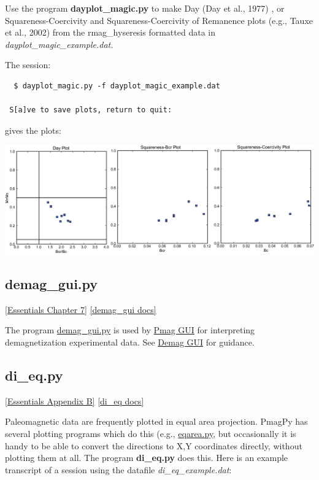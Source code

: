 \documentclass[11pt]{book}
\begin{document}
{{ Use the program {\bf dayplot\_magic.py}  to make Day (Day et al., 1977) \nocite{day77}, or Squareness-Coercivity and Squareness-Coercivity of Remanence plots (e.g., Tauxe et al., 2002) \nocite{tauxe02} from the rmag\_hyseresis formatted data in {\it dayplot\_magic\_example.dat.}

 The session:

  \begin{verbatim}
  $ dayplot_magic.py -f dayplot_magic_example.dat

 S[a]ve to save plots, return to quit:
\end{verbatim}



\noindent gives the plots:

{%
  \includegraphics[width=15cm]{EPSfiles/dayplot.eps}}



\subsection{demag\_gui.py}
\href{http://earthref.org/MAGIC/books/Tauxe/Essentials/WebBook3ch7.html}{[Essentials Chapter 7]}
\href{https://github.com/PmagPy/PmagPy/blob/master/demag_gui.py}{[demag\_gui docs]}

The program \href{#DemagGUI}{demag\_gui.py} is used by \href{#pmag_gui.py}{Pmag GUI} for interpreting demagnetization experimental data.   See \href{#demag_gui.py}{Demag GUI} for guidance.


\subsection{di\_eq.py}
\href{http://earthref.org/MAGIC/books/Tauxe/Essentials/WebBook3ap2.html#equal_area}{[Essentials Appendix B]}
\href{https://github.com/PmagPy/PmagPy/blob/master/programs/di_eq.py}{[di\_eq docs]}

Paleomagnetic data are frequently plotted in equal area projection.  PmagPy has several plotting programs which do this (e.g., \href{#eqarea.py}{eqarea.py}, but occasionally it is handy to be able to convert the directions to X,Y coordinates directly, without plotting them at all.  The program {\bf di\_eq.py} does this.  Here is an example transcript of a session using the datafile {\it di\_eq\_example.dat}:

}}
\end{document}
